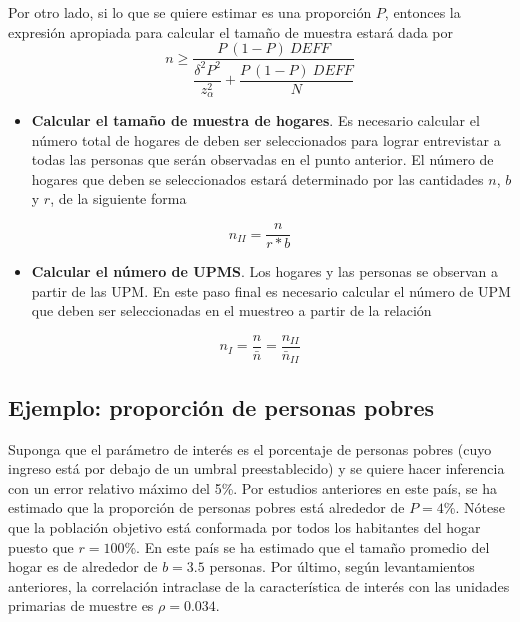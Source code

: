 \documentclass[12pt,spanish,]{book}
\providecommand{\tightlist}{%
  \setlength{\itemsep}{0pt}\setlength{\parskip}{0pt}}
\begin{document}
Por otro lado, si lo que se quiere estimar es una proporción \(P\), entonces la expresión apropiada para calcular el tamaño de muestra estará dada por
\[
n \geq \dfrac{P\ (1-P)\ DEFF}{\dfrac{\delta^2P^2}{z_{\alpha}^2 }+\dfrac{P\ (1-P) \ DEFF}{N}}
\]

\begin{itemize}
\tightlist
\item
  \textbf{Calcular el tamaño de muestra de hogares}. Es necesario calcular el número total de hogares de deben ser seleccionados para lograr entrevistar a todas las personas que serán observadas en el punto anterior. El número de hogares que deben se seleccionados estará determinado por las cantidades \(n\), \(b\) y \(r\), de la siguiente forma
\end{itemize}

\[
n_{II} = \dfrac{n}{r * b}
\]

\begin{itemize}
\tightlist
\item
  \textbf{Calcular el número de UPMS}. Los hogares y las personas se observan a partir de las UPM. En este paso final es necesario calcular el número de UPM que deben ser seleccionadas en el muestreo a partir de la relación
\end{itemize}

\[
n_{I} = \frac{n}{\bar{n}} 
= \frac{n_{II}}{\bar{n}_{II}}
\]

\hypertarget{ejemplo-proporcion-de-personas-pobres}{%
\subsection*{Ejemplo: proporción de personas pobres}\label{ejemplo-proporcion-de-personas-pobres}}

Suponga que el parámetro de interés es el porcentaje de personas pobres (cuyo ingreso está por debajo de un umbral preestablecido) y se quiere hacer inferencia con un error relativo máximo del 5\%. Por estudios anteriores en este país, se ha estimado que la proporción de personas pobres está alrededor de \(P = 4\)\%. Nótese que la población objetivo está conformada por todos los habitantes del hogar puesto que \(r = 100\)\%. En este país se ha estimado que el tamaño promedio del hogar es de alrededor de \(b = 3.5\) personas. Por último, según levantamientos anteriores, la correlación intraclase de la característica de interés con las unidades primarias de muestre es \(\rho = 0.034\).
\end{document}
